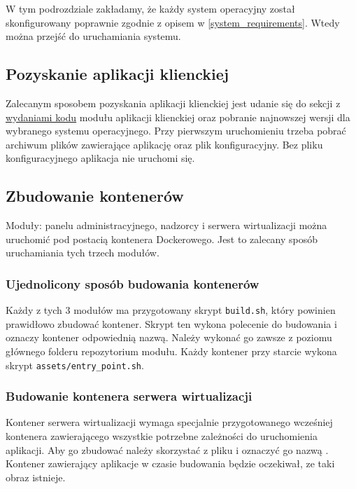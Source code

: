 \documentclass[../opis-rozwiazania.tex]{subfiles}
\begin{document}
\label{system_startup}

W tym podrozdziale zakładamy, że każdy system operacyjny został skonfigurowany poprawnie zgodnie z opisem w \ref{system_requirements}.
Wtedy można przejść do uruchamiania systemu.

\subsection{Pozyskanie aplikacji klienckiej}
\label{system_startup.client_obtaining}
Zalecanym sposobem pozyskania aplikacji klienckiej jest udanie się do sekcji z \href{https://github.com/one-click-desktop/client/releases}{wydaniami kodu} modułu aplikacji klienckiej oraz pobranie najnowszej wersji dla wybranego systemu operacyjnego.
Przy pierwszym uruchomieniu trzeba pobrać archiwum plików zawierające aplikację oraz plik konfiguracyjny.
Bez pliku konfiguracyjnego aplikacja nie uruchomi się.

\subsection{Zbudowanie kontenerów}
\label{system_startup.containers}

Moduły: panelu administracyjnego, nadzorcy i serwera wirtualizacji można uruchomić pod postacią kontenera Dockerowego.
Jest to zalecany sposób uruchamiania tych trzech modułów.

\subsubsection{Ujednolicony sposób budowania kontenerów}
Każdy z tych 3 modułów ma przygotowany skrypt \texttt{build.sh}, który powinien prawidłowo zbudować kontener.
Skrypt ten wykona polecenie do budowania i oznaczy kontener odpowiednią nazwą.
Należy wykonać go zawsze z poziomu głównego folderu repozytorium modułu.
Każdy kontener przy starcie wykona skrypt \texttt{assets/entry\_point.sh}.

\subsubsection{Budowanie kontenera serwera wirtualizacji}
Kontener serwera wirtualizacji wymaga specjalnie przygotowanego wcześniej kontenera zawierającego wszystkie potrzebne zależności do uruchomienia aplikacji.
Aby go zbudować należy skorzystać z pliku \texttt{} i oznaczyć go nazwą \texttt{}.
Kontener zawierający aplikacje w czasie budowania będzie oczekiwał, ze taki obraz istnieje.
\end{document}
